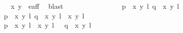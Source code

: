 \begin{isabellebody}
\ \ \ \ \ \ \ \ \ \ \ \ \ \ {\isachardoublequoteopen}{\isacharparenleft}x{\isacharprime}{\isacharcomma}\ y{\isacharprime}{\isacharparenright}\ {\isasymin}\ e{\isacharunderscore}aff{\isachardoublequoteclose}\ \isamarkupfalse%
\ blast\isanewline
\ \ \isamarkupfalse%
\ \isamarkupfalse%
\isanewline
\ \ \ \ \ \ \ \ \ \ \ {\isacharparenleft}{}{\isacharparenright}\ {\isachardoublequoteopen}p\ {\isacharequal}\ {\isacharbraceleft}{\isacharparenleft}{\isacharparenleft}x{\isacharcomma}\ y{\isacharparenright}{\isacharcomma}\ l{\isacharparenright}{\isacharbraceright}{\isachardoublequoteclose}\ {\isachardoublequoteopen}q\ {\isacharequal}\ {\isacharbraceleft}{\isacharparenleft}{\isacharparenleft}x{\isacharprime}{\isacharcomma}\ y{\isacharprime}{\isacharparenright}{\isacharcomma}\ l{\isacharprime}{\isacharparenright}{\isacharbraceright}{\isachardoublequoteclose}\ {\isacharbar}\isanewline
\ \ \ \ \ \ \ \ \ \ \ {\isacharparenleft}{}{\isacharparenright}\ {\isachardoublequoteopen}p\ {\isacharequal}\ {\isacharbraceleft}{\isacharparenleft}{\isacharparenleft}x{\isacharcomma}\ y{\isacharparenright}{\isacharcomma}\ l{\isacharparenright}{\isacharbraceright}{\isachardoublequoteclose}\ {\isachardoublequoteopen}q\ {\isacharequal}\ {\isacharbraceleft}{\isacharparenleft}{\isacharparenleft}x{\isacharprime}{\isacharcomma}\ y{\isacharprime}{\isacharparenright}{\isacharcomma}\ l{\isacharprime}{\isacharparenright}{\isacharcomma}\ {\isacharparenleft}{\isasymtau}\ {\isacharparenleft}x{\isacharprime}{\isacharcomma}\ y{\isacharprime}{\isacharparenright}{\isacharcomma}\ l{\isacharprime}\ {\isacharplus}\ {}{\isacharparenright}{\isacharbraceright}{\isachardoublequoteclose}\ {\isacharbar}\isanewline
\ \ \ \ \ \ \ \ \ \ \ {\isacharparenleft}{}{\isacharparenright}\ {\isachardoublequoteopen}p\ {\isacharequal}\ {\isacharbraceleft}{\isacharparenleft}{\isacharparenleft}x{\isacharcomma}\ y{\isacharparenright}{\isacharcomma}\ l{\isacharparenright}{\isacharcomma}\ {\isacharparenleft}{\isasymtau}\ {\isacharparenleft}x{\isacharcomma}\ y{\isacharparenright}{\isacharcomma}\ l\ {\isacharplus}\ {}{\isacharparenright}{\isacharbraceright}{\isachardoublequoteclose}\ {\isachardoublequoteopen}q\ {\isacharequal}\ {\isacharbraceleft}{\isacharparenleft}{\isacharparenleft}x{\isacharprime}{\isacharcomma}\ y{\isacharprime}{\isacharparenright}{\isacharcomma}\ l{\isacharprime}{\isacharparenright}{\isacharbraceright}{\isachardoublequoteclose}\ {\isacharbar}\isanewline

\end{isabellebody}
